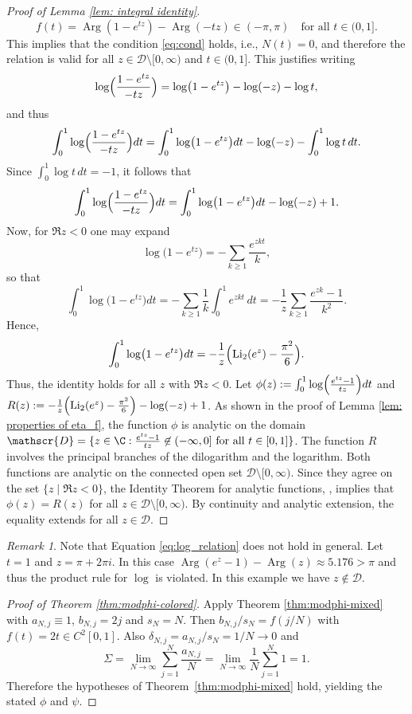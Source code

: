 \documentclass[11pt,a4paper]{scrartcl}
\numberwithin{equation}{section}
\theoremstyle{plain}
\theoremstyle{definition}
\theoremstyle{remark}
\newtheorem{remark}{Remark}[section]
\newenvironment{proofof}[1]{\begin{proof}[Proof of #1]}{\end{proof}}
\begin{document}
\begin{proofof}{Lemma {\ref{lem: integral identity}}}
\[
f(t) = \operatorname{Arg}(1-e^{tz}) - \operatorname{Arg}(-tz) \in (-\pi, \pi) \quad \text{for all } t \in (0, 1].
\]
This implies that the condition \eqref{eq:cond} holds, i.e., $N(t)=0$, and therefore the relation is valid for all $z \in \mathscr{D} \setminus [0, \infty)$ and $t \in (0, 1]$. This justifies writing
\[
\log\Bigl(\frac{1-e^{tz}}{-tz}\Bigr)
=\log\bigl(1-e^{tz}\bigr)-\log(-z)-\log t,
\]
and thus
\[
\int_0^1\log\Bigl(\frac{1-e^{tz}}{-tz}\Bigr)dt
=\int_0^1\log\bigl(1-e^{tz}\bigr)dt-\log(-z)-\int_0^1\log t\,dt.
\]
Since \(\int_0^1\log t\,dt=-1\), it follows that
\[
\int_0^1\log\Bigl(\frac{1-e^{tz}}{-tz}\Bigr)dt
=\int_0^1\log\bigl(1-e^{tz}\bigr)dt-\log(-z)+1.
\]
Now, for \(\Re z < 0\) one may expand
\[
\log\bigl(1-e^{tz}\bigr)=-\sum_{k\ge1}\frac{e^{zkt}}{k},
\]
so that
\[
\int_0^1\log\bigl(1-e^{tz}\bigr)dt
=-\sum_{k\ge1}\frac{1}{k}\int_0^1e^{zkt}\,dt
=-\frac{1}{z}\sum_{k\ge1}\frac{e^{zk}-1}{k^2}.
\]
Hence,
\[
\int_0^1\log\bigl(1-e^{tz}\bigr)dt
=-\frac{1}{z}\Bigl(\operatorname{Li}_2(e^z)-\frac{\pi^2}{6}\Bigr).
\]
Thus, the identity holds for all $z$ with $\Re z < 0$. Let $\phi(z) := \int_0^1 \log\Bigl(\frac{e^{tz}-1}{tz}\Bigr)dt$ and $R(z) := -\frac{1}{z}\Bigl(\operatorname{Li}_2(e^z)-\frac{\pi^2}{6}\Bigr)-\log(-z)+1$. As shown in the proof of Lemma \ref{lem: properties of eta_f}, the function $\phi$ is analytic on the domain $\mathscr{D} = \{z\in \C: \frac{e^{tz}-1}{tz}\not\in (-\infty, 0] \text{ for all } t\in [0,1]\}$. The function $R$ involves the principal branches of the dilogarithm and the logarithm. Both functions are analytic on the connected open set $\mathscr{D} \setminus [0, \infty)$. Since they agree on the set $\{ z \mid \Re z < 0 \}$, the Identity Theorem for analytic functions, \cite[Theorem 3.2.6]{ablowitz2003complex}, implies that $\phi(z) = R(z)$ for all $z \in \mathscr{D} \setminus [0, \infty)$. By continuity and analytic extension, the equality extends for all $z \in \mathscr{D}$. 
\end{proofof}

\begin{remark}
Note that Equation \eqref{eq:log_relation} does not hold in general. Let $t=1$ and $z = \pi + 2\pi i$. In this case $\operatorname{Arg}(e^z-1) - \operatorname{Arg}(z) \approx 5.176 > \pi$ and thus the product rule for $\log$ is violated. In this example we have $z \notin \mathscr{D}$.
\end{remark}

\begin{proofof}{Theorem {\ref{thm:modphi-colored}}}
Apply Theorem \ref{thm:modphi-mixed} with \(a_{N,j}\equiv1\), \(b_{N,j}=2j\) and \(s_N=N\). Then \(b_{N,j}/s_N=f(j/N)\) with \(f(t)=2t\in C^2[0,1]\). Also \(\delta_{N,j}=a_{N,j}/s_N=1/N\to0\) and
\[
\Sigma=\lim_{N\to\infty}\sum_{j=1}^N\frac{a_{N,j}}{N}
=\lim_{N\to\infty}\frac{1}{N}\sum_{j=1}^N 1 = 1.
\]
Therefore the hypotheses of Theorem~\ref{thm:modphi-mixed} hold, yielding the stated \(\phi\) and \(\psi\).
\end{proofof}
\end{document}
